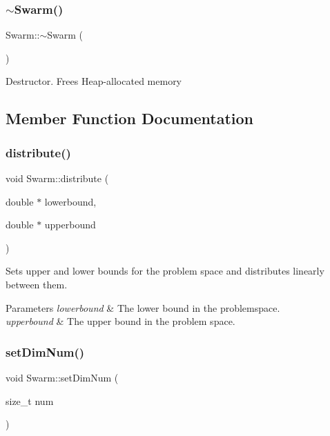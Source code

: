 \subsubsection{\texorpdfstring{$\sim$\+Swarm()}{~Swarm()}}
{\footnotesize\ttfamily Swarm\+::$\sim$\+Swarm (\begin{DoxyParamCaption}{ }\end{DoxyParamCaption})}

Destructor. Frees Heap-\/allocated memory 

\subsection{Member Function Documentation}
\mbox{\label{class_swarm_a9da23c6a5013d4d24b1591e6a44c803e}} 
\subsubsection{\texorpdfstring{distribute()}{distribute()}}
{\footnotesize\ttfamily void Swarm\+::distribute (\begin{DoxyParamCaption}\item[{double $\ast$}]{lowerbound,  }\item[{double $\ast$}]{upperbound }\end{DoxyParamCaption})}

Sets upper and lower bounds for the problem space and distributes linearly between them. 
\begin{DoxyParams}{Parameters}
{\em lowerbound} & The lower bound in the problemspace. \\
\hline
{\em upperbound} & The upper bound in the problem space. \\
\hline
\end{DoxyParams}
\mbox{\label{class_swarm_ad8214af418b80dc9a6f2d72ce2aeb5d4}} 
\subsubsection{\texorpdfstring{set\+Dim\+Num()}{setDimNum()}}
{\footnotesize\ttfamily void Swarm\+::set\+Dim\+Num (\begin{DoxyParamCaption}\item[{size\+\_\+t}]{num }\end{DoxyParamCaption})}

